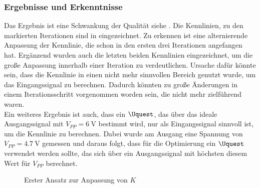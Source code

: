 \documentclass[../Report.tex]{subfiles}
\begin{document}
\subsubsection*{Ergebnisse und Erkenntnisse}
\label{subsubsec:opt.adjusta.results}
Das Ergebnis ist eine Schwankung der Qualität siehe . Die Kennlinien, zu den markierten Iterationen sind in  eingezeichnet. Zu erkennen ist eine alternierende Anpassung der Kennlinie, die schon in den ersten drei Iterationen angefangen hat. Ergänzend wurden auch die letzten beiden Kennlinien eingezeichnet, um die große Anpassung innerhalb einer Iteration zu verdeutlichen. Ursache dafür könnte sein, dass die Kennlinie in einen nicht mehr sinnvollen Bereich genutzt wurde, um das Eingangssignal zu berechnen. Dadurch könnten zu große Änderungen in einem Iterationsschritt vorgenommen worden sein, die nicht mehr zielführend waren.\\
Ein weiteres Ergebnis ist auch, dass ein $\Uquest$, das über das ideale Ausgangssignal mit $V_{PP} = \SI{6}{\V}$ bestimmt wird, nur als Eingangssignal sinnvoll ist, um die Kennlinie zu berechnen. Dabei wurde am Ausgang eine Spannung von $V_{PP} = \SI{4,7}{\V}$ gemessen und daraus folgt, dass für die Optimierung ein $\Uquest$ verwendet werden sollte, das sich über ein Ausgangssignal mit höchsten diesem Wert für $V_{PP}$ berechnet.
\begin{figure}[H]
\begin{subfigure}{0.5 \textwidth}
    \newlength\figureheight
	\newlength\figurewidth
	\setlength\figureheight{8cm}
	\setlength\figurewidth{8cm}
    
	\label{fig:evaluate30K}
\end{subfigure}
\begin{subfigure}{0.5 \textwidth}
	\setlength\figureheight{8cm}
	\setlength\figurewidth{8cm}
    
	\label{fig:evaluate30Q}
\end{subfigure}
\label{fig:opt.evaluate30}
\caption{Erster Ansatz zur Anpassung von $K$}
\end{figure}
\end{document}
